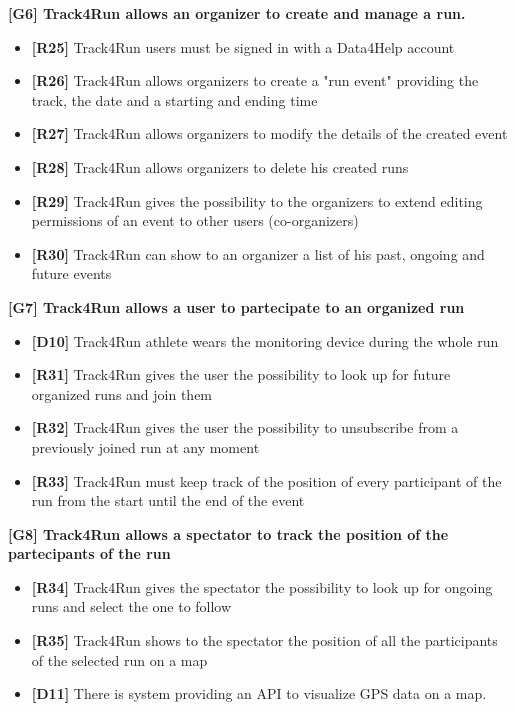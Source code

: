 \textbf{[G6] Track4Run allows an organizer to create and manage a run.}
\begin{itemize}
	\item \textbf{[R25]} Track4Run users must be signed in with a Data4Help account
	\item \textbf{[R26]} Track4Run allows organizers to create a "run event" providing the track, the date and a starting and ending time
	\item \textbf{[R27]}  Track4Run allows organizers to modify the details of the created event
	\item \textbf{[R28]} Track4Run allows organizers to delete his created runs
	\item \textbf{[R29]} Track4Run gives the possibility to the organizers to extend editing permissions of an event to other users (co-organizers) 
	\item \textbf{[R30]} Track4Run can show to an organizer a list of his past, ongoing and future events
\end{itemize}

\textbf{[G7] Track4Run allows a user to partecipate to an organized run}
\begin{itemize}
	\item \textbf{[D10]} Track4Run athlete wears the monitoring device during the whole run
	\item \textbf{[R31]} Track4Run gives the user the possibility to look up for future organized runs and join them
	\item \textbf{[R32]} Track4Run gives the user the possibility to unsubscribe from a previously joined run at any moment
	\item \textbf{[R33]} Track4Run must keep track of the position of every participant of the run from the start until the end of the event
\end{itemize}

\textbf{[G8] Track4Run allows a spectator to track the position of the partecipants of the run}
\begin{itemize}
	\item \textbf{[R34]} Track4Run gives the spectator the possibility to look up for ongoing runs and select the one to follow
	\item \textbf{[R35]} Track4Run shows to the spectator the position of all the participants of the selected run on a map
	\item \textbf{[D11]} There is system providing an API to visualize GPS data on a map.
\end{itemize}
 
